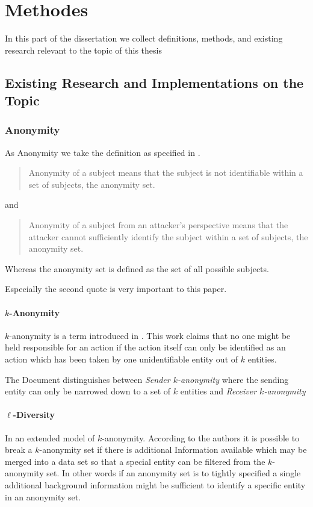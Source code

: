\part{Methodes}
In this part of the dissertation we collect definitions, methods, and existing research relevant to the topic of this thesis

\chapter{Existing Research and Implementations on the Topic}
\section{Anonymity}
As Anonymity we take the definition as specified in \cite{anon_terminology}.
\begin{quote}
	Anonymity of a subject means that the subject is not identifiable within a set of subjects, the anonymity set.\omitted
\end{quote}
and
\begin{quote}
	Anonymity of a subject from an attacker's perspective means that the attacker cannot sufficiently identify the subject within a set of subjects, the anonymity set.\omitted
\end{quote}

Whereas the anonymity set is defined as the set of all possible subjects.

Especially the second quote is very important to this paper. 
\subsection{$k$-Anonymity}
$k$-anonymity is a term introduced in \cite{k-anonymous:ccs2003}. This work claims that no one might be held responsible for an action if the action itself can only be identified as an action which has been taken by one unidentifiable entity out of $k$ entities.

The Document distinguishes between \textit{Sender $k$-anonymity} where the sending entity can only be narrowed down to a set of $k$ entities and \textit{Receiver $k$-anonymity} 

\subsection{$\ell$-Diversity}
In \cite{machanavajjhala2007diversity} an extended model of $k$-anonymity. According to the authors it is possible to break a $k$-anonymity set if there is additional Information available which may be merged into a data set so that a special entity can be filtered from the $k$-anonymity set. In other words if an anonymity set is to tightly specified a single additional background information might be sufficient to identify a specific entity in an anonymity set.

